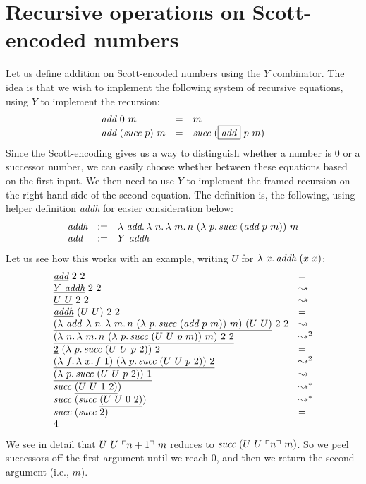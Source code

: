 \section{Recursive operations on Scott-encoded numbers}

Let us define addition on Scott-encoded numbers using the $Y$ combinator.  The idea is that we wish to implement the following
system of recursive equations, using $Y$ to implement the recursion:
\[
\begin{array}{lll}
  \textit{add}\ 0\ m & = & m \\
  \textit{add}\ (\textit{succ}\ p)\ m & = & \textit{succ}\ (\fbox{\textit{add}}\ p\ m)
\end{array}
\]
\noindent Since the Scott-encoding gives us a way to distinguish whether a number is $0$ or a successor number, we can
easily choose whether between these equations based on the first input.  We then need to use $Y$ to implement the framed
recursion on the right-hand side of the second equation.  The definition is, the following, using helper definition \textit{addh} for
easier consideration below:
\[
\begin{array}{lll}
  \textit{addh} & := & \lam{\textit{add}}{\lam{n}{\lam{m}{n\ (\lam{p}{\textit{succ}\ (\textit{add}\ p\ m)})\ m}}} \\
  \textit{add} & := & Y\ \textit{addh}
  \end{array}
\]
\noindent Let us see how this works with an example, writing $U$ for $\lambda\ x.\, \textit{addh}\ (x\ x)$:
\[
\begin{array}{ll}
  \underline{\textit{add}}\ 2\ 2 & = \\
  \underline{Y\ \textit{addh}}\ 2\ 2 & \leadsto \\
  \underline{U\ U}\ 2\ 2 & \leadsto \\  
  \underline{\textit{addh}}\ (U\ U)\ 2\ 2 & = \\
  \underline{(\lam{\textit{add}}{\lam{n}{\lam{m}{n\ (\lam{p}{\textit{succ}\ (\textit{add}\ p\ m)})\ m}}})\ (U\ U)}\ 2\ 2 & \leadsto \\  
  \underline{(\lam{n}{\lam{m}{n\ (\lam{p}{\textit{succ}\ (U\ U\ p\ m)})\ m}})\ 2\ 2} & \leadsto^2 \\
  \underline{2}\ (\lam{p}{\textit{succ}\ (U\ U\ p\ 2)})\ 2 & = \\
  \underline{(\lam{f}{\lam{x}{f\ 1}})\ (\lam{p}{\textit{succ}\ (U\ U\ p\ 2)})\ 2} & \leadsto^2 \\
  \underline{(\lam{p}{\textit{succ}\ (U\ U\ p\ 2)})\ 1} & \leadsto \\
  \textit{succ}\ \underline{(U\ U\ 1\ 2)}) & \leadsto^* \\
  \textit{succ}\ (\textit{succ}\ \underline{(U\ U\ 0\ 2)}) & \leadsto^* \\
  \textit{succ}\ (\textit{succ}\ 2) & = \\
  4 &\ 
  \end{array}
\]
\noindent We see in detail that $U\ U\ \ulcorner n+1 \urcorner\ m$ reduces to
$\textit{succ}\ (U\ U\ \ulcorner n \urcorner\ m)$.  So we peel successors off the
first argument until we reach $0$, and then we return the second
argument (i.e., $m$).

